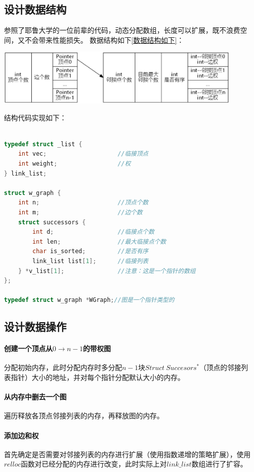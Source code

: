 \documentclass[a4paper,10pt]{ctexart}
\begin{document}
\subsection{设计数据结构}
参照了耶鲁大学的一位前辈的代码，动态分配数组，长度可以扩展，既不浪费空间，又不会带来性能损失。
数据结构如下\ref{数据结构如下}：

\includegraphics[width=0.9\textwidth]{../Pics/DataStruct.eps}

结构代码实现如下：
\begin{lstlisting}[language={C}]

typedef struct _list {
    int vec;                    //临接顶点
    int weight;                 //权
} link_list;

struct w_graph {
    int n;                      //顶点个数
    int m;                      //边个数
    struct successors {
        int d;                  //临接点个数
        int len;                //最大临接点个数
        char is_sorted;         //是否有序
        link_list list[1];      //临接列表
    } *v_list[1];               //注意：这是一个指针的数组
};

typedef struct w_graph *WGraph;//图是一个指针类型的
\end{lstlisting}
\subsection{设计数据操作}

\paragraph{创建一个顶点从$0 \to n-1$的带权图}分配初始内存，此时分配内存时多分配$n-1$块$Struct\ Succesors^*$（顶点的邻接列表指针）大小的地址，并对每个指针分配默认大小的内存。
\paragraph{从内存中删去一个图}遍历释放各顶点邻接列表的内存，再释放图的内存。
\paragraph{添加边和权}首先确定是否需要对邻接列表的内存进行扩展（使用指数递增的策略扩展），使用$relloc$函数对已经分配的内存进行改变，此时实际上对$link\_list$数组进行了扩容。
\end{document}
